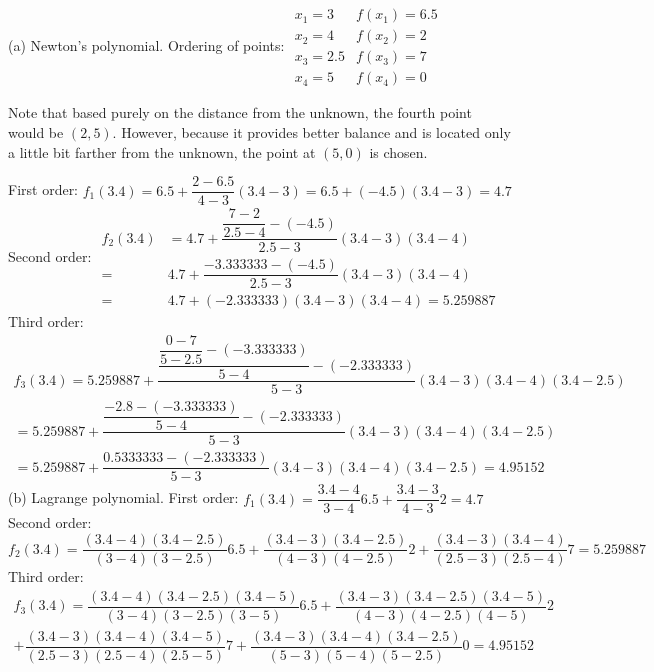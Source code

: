 \documentclass[../main.tex]{subfiles}
\begin{document}
\chapter{}
\label{cha:cha_14}

\section{}
(a) Newton's polynomial. Ordering of points:
	\bigbreak
$
\begin{array}{ll}
x_{1}=3 & f\left(x_{1}\right)=6.5 \\
x_{2}=4 & f\left(x_{2}\right)=2 \\
x_{3}=2.5 & f\left(x_{3}\right)=7 \\
x_{4}=5 & f\left(x_{4}\right)=0
\end{array}
$
	\bigbreak
\begin{blockquote}
Note that based purely on the distance from the unknown, the fourth point would be $(2,5)$. However, because it provides better balance and is located only a little bit farther from the unknown, the point at $(5,0)$ is chosen.
\end{blockquote}
	\bigbreak
First order:
	\bigbreak
$
f_{1}(3.4)=6.5+\dfrac{2-6.5}{4-3}(3.4-3)=6.5+(-4.5)(3.4-3)=4.7
$
	\bigbreak
Second order:
	\bigbreak
$
\begin{aligned}
f_{2}(3.4) &=4.7+\dfrac{\dfrac{7-2}{2.5-4}-(-4.5)}{2.5-3}(3.4-3)(3.4-4) \\
=& 4.7+\dfrac{-3.333333-(-4.5)}{2.5-3}(3.4-3)(3.4-4) \\
=& 4.7+(-2.333333)(3.4-3)(3.4-4)=5.259887
\end{aligned}
$
	\bigbreak
Third order:
	\bigbreak
$
\begin{aligned}
f_{3}(3.4)=5.259887+\dfrac{\dfrac{\dfrac{0-7}{5-2.5}-(-3.333333)}{5-4}-(-2.333333)}{5-3}(3.4-3)(3.4-4)(3.4-2.5)\\
=5.259887+\dfrac{\dfrac{-2.8-(-3.333333)}{5-4}-(-2.333333)}{5-3}(3.4-3)(3.4-4)(3.4-2.5)\\
=5.259887+\dfrac{0.5333333-(-2.333333)}{5-3}(3.4-3)(3.4-4)(3.4-2.5)=4.95152
\end{aligned}
$
	\bigbreak
(b) Lagrange polynomial.
	\bigbreak
First order:
	\bigbreak
$f_{1}(3.4)=\dfrac{3.4-4}{3-4} 6.5+\dfrac{3.4-3}{4-3} 2=4.7$
	\bigbreak
Second order:
	\bigbreak
$f_{2}(3.4)=\dfrac{(3.4-4)(3.4-2.5)}{(3-4)(3-2.5)} 6.5+\dfrac{(3.4-3)(3.4-2.5)}{(4-3)(4-2.5)} 2+\dfrac{(3.4-3)(3.4-4)}{(2.5-3)(2.5-4)} 7=5.259887$
	\bigbreak
Third order:
	\bigbreak
$
\begin{aligned}
f_{3}(3.4)=\dfrac{(3.4-4)(3.4-2.5)(3.4-5)}{(3-4)(3-2.5)(3-5)} 6.5+\dfrac{(3.4-3)(3.4-2.5)(3.4-5)}{(4-3)(4-2.5)(4-5)} 2\\
+ \dfrac{(3.4-3)(3.4-4)(3.4-5)}{(2.5-3)(2.5-4)(2.5-5)} 7+\dfrac{(3.4-3)(3.4-4)(3.4-2.5)}{(5-3)(5-4)(5-2.5)} 0=4.95152
\end{aligned}
$
	\bigbreak
\end{document}
